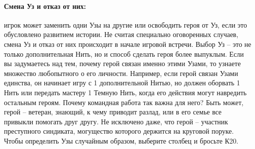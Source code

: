\paragraph{Смена Уз и отказ от них:} игрок может заменить одни Узы на другие или освободить героя от Уз, если это обусловлено развитием истории. Не считая специально оговоренных случаев, смена Уз и отказ от них происходит в начале игровой встречи.
\newline Выбор Уз – это не только дополнительная Нить, но и способ сделать героя более выпуклым. Если вы задумаетесь над тем, почему герой связан именно этими Узами, то узнаете множество любопытного о его личности. Например, если герой связан Узами единства, он начинает игру с 1 дополнительной Нитью, но должен оборвать 1 Нить или передать мастеру 1 Темную Нить, когда его действия могут навредить остальным героям. Почему командная работа так важна для него? Быть может, герой – ветеран, знающий, к чему приводит разлад, или в его семье все привыкли помогать друг другу. Не исключено даже, что герой – участник преступного синдиката, могущество которого держится на круговой поруке.
\newline Чтобы определить Узы случайным образом, выберите столбец и бросьте К20.

